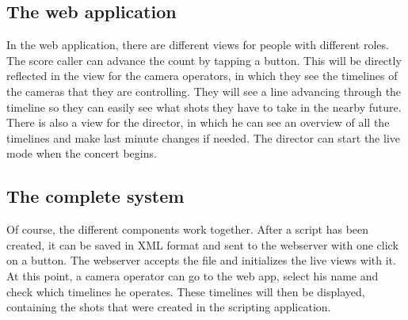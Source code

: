 \subsection{The web application}
In the web application, there are different views for people with different roles. The score caller can advance the count by tapping a button. This will be directly reflected in the view for the camera operators, in which they see the timelines of the cameras that they are controlling. They will see a line advancing through the timeline so they can easily see what shots they have to take in the nearby future. There is also a view for the director, in which he can see an overview of all the timelines and make last minute changes if needed. The director can start the live mode when the concert begins.

\subsection{The complete system}
Of course, the different components work together. After a script has been created, it can be saved in XML format and sent to the webserver with one click on a button. The webserver accepts the file and initializes the live views with it. At this point, a camera operator can go to the web app, select his name and check which timelines he operates. These timelines will then be displayed, containing the shots that were created in the scripting application.\\
